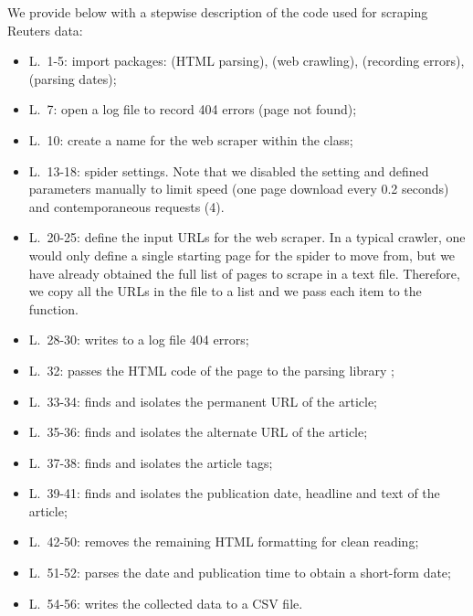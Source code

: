 \documentclass[12pt]{article}
\begin{document}
We provide below with a stepwise description of the  code used for scraping Reuters data:
\begin{itemize}
\item L.~1-5: import packages:   (HTML parsing),  (web
crawling),  (recording errors),  (parsing dates);

\item L.~7: open a log file to record 404 errors (page not found);

\item L.~10: create a name for the web scraper within the 
class;

\item L.~13-18: spider settings. Note that we disabled the 
setting and defined parameters manually to limit speed (one page download
every 0.2 seconds) and contemporaneous requests (4).

\item L.~20-25: define the input URLs for the web scraper. In a typical 
crawler, one would only define a single starting page for the spider to move
from, but we have already obtained the full list of pages to scrape in a
text file. Therefore, we copy all the URLs in the file to a list and we pass
each item to the  function.

\item L.~28-30: writes to a log file 404 errors;

\item L.~32: passes the HTML code of the page to the parsing library ;

\item L.~33-34: finds and isolates the permanent URL of the article;

\item L.~35-36: finds and isolates the alternate URL of the article;

\item L.~37-38: finds and isolates the article tags;

\item L.~39-41: finds and isolates the publication date, headline and text of
the article;

\item L.~42-50: removes the remaining HTML formatting for clean reading;

\item L.~51-52: parses the date and publication time to obtain a short-form date;

\item L.~54-56: writes the collected data to a CSV file.
\end{itemize}
\end{document}
